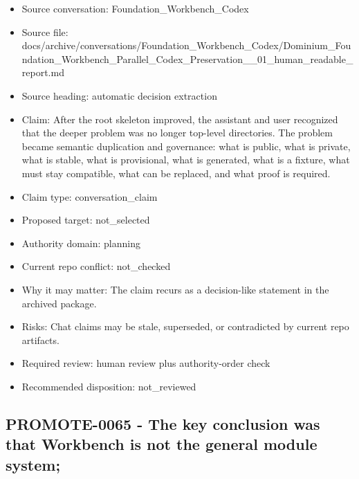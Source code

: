 \documentclass[11pt,a4paper]{report}
\begin{document}
\begin{itemize}
\item Source conversation: Foundation\_Workbench\_Codex
\item Source file: docs/archive/conversations/Foundation\_Workbench\_Codex/Dominium\_Foundation\_Workbench\_Parallel\_Codex\_Preservation\_\_01\_human\_readable\_report.md
\item Source heading: automatic decision extraction
\item Claim: After the root skeleton improved, the assistant and user recognized that the deeper problem was no longer top-level directories. The problem became semantic duplication and governance: what is public, what is private, what is stable, what is provisional, what is generated, what is a fixture, what must stay compatible, what can be replaced, and what proof is required.
\item Claim type: conversation\_claim
\item Proposed target: not\_selected
\item Authority domain: planning
\item Current repo conflict: not\_checked
\item Why it may matter: The claim recurs as a decision-like statement in the archived package.
\item Risks: Chat claims may be stale, superseded, or contradicted by current repo artifacts.
\item Required review: human review plus authority-order check
\item Recommended disposition: not\_reviewed
\end{itemize}

\subsection{PROMOTE-0065 - The key conclusion was that Workbench is not the general module system;}
\end{document}
